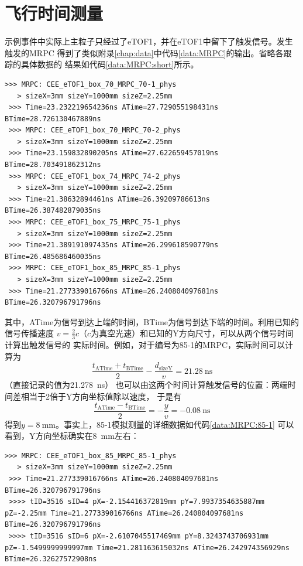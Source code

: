 \documentclass[bachelor,openany,oneside,color]{buaathesis}
\begin{document}
\section{飞行时间测量}

示例事件中实际上主粒子只经过了eTOF1，并在eTOF1中留下了触发信号。发生触发的MRPC
得到了类似附录\ref{chap:data}中代码\ref{data:MRPC}的输出。省略各跟踪的具体数据的
结果如代码\ref{data:MRPC:short}所示。
\begin{lstlisting}[caption={eTOF1-MRPC简略版，其中所有size均为半长度},
	numbers=none,label={data:MRPC:short}]
 >>> MRPC: CEE_eTOF1_box_70_MRPC_70-1_phys
   > sizeX=3mm sizeY=1000mm sizeZ=2.25mm 
 >>> Time=23.232219654236ns ATime=27.729055198431ns BTime=28.726130467889ns
 >>> MRPC: CEE_eTOF1_box_70_MRPC_70-2_phys
   > sizeX=3mm sizeY=1000mm sizeZ=2.25mm 
 >>> Time=23.159832890205ns ATime=27.622659457019ns BTime=28.703491862312ns
 >>> MRPC: CEE_eTOF1_box_74_MRPC_74-2_phys
   > sizeX=3mm sizeY=1000mm sizeZ=2.25mm 
 >>> Time=21.38632894461ns ATime=26.39209786613ns BTime=26.387482879035ns
 >>> MRPC: CEE_eTOF1_box_75_MRPC_75-1_phys
   > sizeX=3mm sizeY=1000mm sizeZ=2.25mm 
 >>> Time=21.389191097435ns ATime=26.299618590779ns BTime=26.485686460035ns
 >>> MRPC: CEE_eTOF1_box_85_MRPC_85-1_phys
   > sizeX=3mm sizeY=1000mm sizeZ=2.25mm 
 >>> Time=21.277339016766ns ATime=26.240804097681ns BTime=26.320796791796ns
\end{lstlisting}

其中，ATime为信号到达上端的时间，BTime为信号到达下端的时间。利用已知的信号传播速度
$v=\frac23c$（$c$为真空光速）和已知的Y方向尺寸，可以从两个信号时间计算出触发信号的
实际时间。例如，对于编号为85-1的MRPC，实际时间可以计算为
\begin{equation}
\frac{t_{\text{ATime}}+t_{\text{BTime}} }{2}-\frac{d_{\text{sizeY}} }{v}
	=\SI{21.28}{\nano\second}
\end{equation}
（直接记录的值为\SI{21.278}{\nano\second}）
也可以由这两个时间计算触发信号的位置：两端时间差相当于2倍于Y方向坐标值除以速度，
于是有
\begin{equation}
\frac{t_{\text{ATime}}-t_{\text{BTime}} }{2}=-\frac{y}{v}=\SI{-0.08}{\nano\second}
\end{equation}
得到$y=\SI{8}{\milli\meter}$。事实上，85-1模拟测量的详细数据如代码\ref{data:MRPC:85-1}
可以看到，Y方向坐标确实在\SI{8}{\milli\meter}左右：
\begin{lstlisting}[caption={eTOF1-MRPC-85-1},label={data:MRPC:85-1},firstnumber=4449,lastline=4453]
 >>> MRPC: CEE_eTOF1_box_85_MRPC_85-1_phys
   > sizeX=3mm sizeY=1000mm sizeZ=2.25mm 
 >>> Time=21.277339016766ns ATime=26.240804097681ns BTime=26.320796791796ns
 >>>> tID=3516 sID=4 pX=-2.154416372819mm pY=7.9937354635887mm pZ=-2.25mm Time=21.277339016766ns ATime=26.240804097681ns BTime=26.320796791796ns
 >>>> tID=3516 sID=6 pX=-2.6107045517469mm pY=8.3243743706931mm pZ=-1.5499999999997mm Time=21.281163615032ns ATime=26.242974356929ns BTime=26.32627572908ns
\end{lstlisting}
\end{document}
